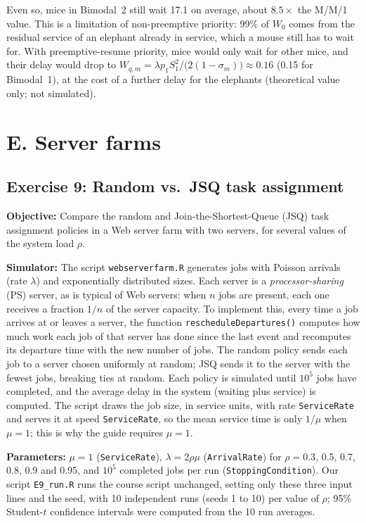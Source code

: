 ﻿\documentclass[12pt]{article}
\begin{document}
Even so, mice in Bimodal~2 still wait 17.1 on average, about $8.5\times$ the
M/M/1 value. This is a limitation of non-preemptive priority: 99\% of $W_0$
comes from the residual service of an elephant already in service, which a
mouse still has to wait for. With preemptive-resume priority, mice would only
wait for other mice, and their delay would drop to
$W_{q,m}=\lambda p_1 S_1^2/\big(2(1-\sigma_m)\big)\approx0.16$
(0.15 for Bimodal~1), at the cost of a further delay for the elephants
(theoretical value only; not simulated).

\section{E. Server farms}\label{sec:E}

\subsection{Exercise 9: Random vs.\ JSQ task assignment}

\textbf{Objective:} Compare the random and Join-the-Shortest-Queue (JSQ) task
assignment policies in a Web server farm with two servers, for several values of
the system load $\rho$.

\textbf{Simulator:} The script \texttt{webserverfarm.R} generates jobs with
Poisson arrivals (rate $\lambda$) and exponentially distributed sizes. Each
server is a \emph{processor-sharing} (PS) server, as is typical of Web servers:
when $n$ jobs are present, each one receives a fraction $1/n$ of the server
capacity. To implement this, every time a job arrives at or leaves a server,
the function \texttt{rescheduleDepartures()} computes how much work each job
of that server has done since the last event and recomputes its departure
time with the new number of jobs. The random policy sends each job to a server
chosen uniformly at random; JSQ sends it to the server with the fewest jobs,
breaking ties at random. Each policy is simulated until $10^5$ jobs have
completed, and the average delay in the system (waiting plus service) is
computed. The script draws the job size, in service units, with rate
\texttt{ServiceRate} and serves it at speed \texttt{ServiceRate}, so the mean
service time is only $1/\mu$ when $\mu=1$; this is why the guide requires
$\mu=1$.

\textbf{Parameters:} $\mu=1$ (\texttt{ServiceRate}), $\lambda=2\rho\mu$
(\texttt{ArrivalRate}) for $\rho=0.3$, 0.5, 0.7, 0.8, 0.9 and 0.95, and
$10^5$ completed jobs per run (\texttt{StoppingCondition}). Our script
\texttt{E9\_run.R} runs the course script unchanged, setting only these three
input lines and the seed, with 10 independent runs (seeds 1 to 10) per value of
$\rho$; 95\% Student-$t$ confidence intervals were computed from the 10 run
averages.
\end{document}
